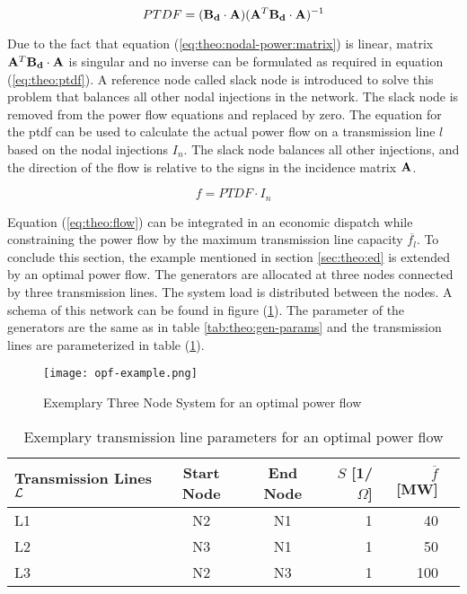 \begin{equation}
	PTDF = (\vb{B_d} \cdot \vb{A})(\vb{A}^T \vb{B_d} \cdot \vb{A})^{-1} \label{eq:theo:ptdf}
\end{equation}

Due to the fact that equation (\ref{eq:theo:nodal-power:matrix}) is linear, matrix $\vb{A}^T \vb{B_d} \cdot \vb{A}$ is singular and no inverse can be formulated as required in equation (\ref{eq:theo:ptdf}). A reference node called slack node is introduced to solve this problem that balances all other nodal injections in the network. The slack node is removed from the power flow equations and replaced by zero. The equation for the \gls{ptdf} can be used to calculate the actual power flow on a transmission line $l$ based on the nodal injections $I_n$. The slack node balances all other injections, and the direction of the flow is relative to the signs in the incidence matrix $\vb{A}$.

\begin{equation}
	f = PTDF \cdot I_n \label{eq:theo:flow}
\end{equation}

Equation (\ref{eq:theo:flow}) can be integrated in an economic dispatch while constraining the power flow by the maximum transmission line capacity $\overline{f_l}$. To conclude this section, the example mentioned in section \ref{sec:theo:ed} is extended by an optimal power flow. The generators are allocated at three nodes connected by three transmission lines. The system load is distributed between the nodes. A schema of this network can be found in figure (\ref{fig:opf}). The parameter of the generators are the same as in table \ref{tab:theo:gen-params} and the transmission lines are parameterized in table (\ref{tab:theo:line-params}).

\begin{figure}[h]
	\centering
	\texttt{[image: opf-example.png]}
	\caption{Exemplary Three Node System for an optimal power flow}
	\label{fig:opf}
\end{figure}

\begin{table}[h!]
    \centering
    \begin{tabular}{lccrrc}
        Transmission Lines $\mathcal{L}$ & Start Node & End Node & $S$ [1/$\Omega$] & $\overline{f}$ [MW] \\ \toprule
        L1 & N2 & N1 & 1 & 40 \\
        L2 & N3 & N1 & 1 & 50 \\
        L3 & N2 & N3 & 1 & 100 \\
        \bottomrule
    \end{tabular}
    \caption{Exemplary transmission line parameters for an optimal power flow} \label{tab:theo:line-params}
\end{table}

